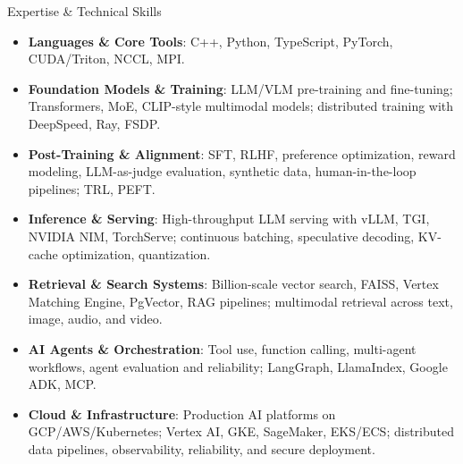 \documentclass[
	10pt, %
]{resume} %
\begin{document}
\begin{rSection}{Expertise \& Technical Skills}
\begin{itemize}

\item \textbf{Languages \& Core Tools}: C++, Python, TypeScript, PyTorch, CUDA/Triton, NCCL, MPI.

\item \textbf{Foundation Models \& Training}: LLM/VLM pre-training and fine-tuning; Transformers, MoE, CLIP-style multimodal models; distributed training with DeepSpeed, Ray, FSDP.

\item \textbf{Post-Training \& Alignment}: SFT, RLHF, preference optimization, reward modeling, LLM-as-judge evaluation, synthetic data, human-in-the-loop pipelines; TRL, PEFT.

\item \textbf{Inference \& Serving}: High-throughput LLM serving with vLLM, TGI, NVIDIA NIM, TorchServe; continuous batching, speculative decoding, KV-cache optimization, quantization.

\item \textbf{Retrieval \& Search Systems}: Billion-scale vector search, FAISS, Vertex Matching Engine, PgVector, RAG pipelines; multimodal retrieval across text, image, audio, and video.

\item \textbf{AI Agents \& Orchestration}: Tool use, function calling, multi-agent workflows, agent evaluation and reliability; LangGraph, LlamaIndex, Google ADK, MCP.

\item \textbf{Cloud \& Infrastructure}: Production AI platforms on GCP/AWS/Kubernetes; Vertex AI, GKE, SageMaker, EKS/ECS; distributed data pipelines, observability, reliability, and secure deployment.

\end{itemize}

\end{rSection}



\end{document}
